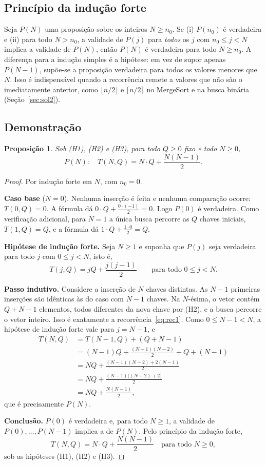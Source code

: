 \documentclass[11pt,a4paper]{article}
\newtheorem{proposicao}{Proposição}
\begin{document}
\subsection{Princípio da indução forte}

Seja $P(N)$ uma proposição sobre os inteiros $N\ge n_0$. Se (i) $P(n_0)$ é verdadeira e (ii) para todo $N>n_0$, a validade de $P(j)$ para \emph{todos} os $j$ com $n_0\le j<N$ implica a validade de $P(N)$, então $P(N)$ é verdadeira para todo $N\ge n_0$. A diferença para a indução simples é a hipótese: em vez de supor apenas $P(N-1)$, supõe-se a proposição verdadeira para todos os valores menores que $N$. Isso é indispensável quando a recorrência remete a valores que não são o imediatamente anterior, como $\lfloor n/2\rfloor$ e $\lceil n/2\rceil$ no MergeSort e na busca binária (Seção~\ref{sec:sol2}).

\subsection{Demonstração}

\begin{proposicao}
\label{prop:t1}
Sob (H1), (H2) e (H3), para todo $Q\ge0$ fixo e todo $N\ge0$,
\[
P(N):\quad T(N,Q)=N\cdot Q+\frac{N(N-1)}{2}.
\]
\end{proposicao}

\begin{proof}
Por indução forte em $N$, com $n_0=0$.

\textbf{Caso base} ($N=0$). Nenhuma inserção é feita e nenhuma comparação ocorre: $T(0,Q)=0$. A fórmula dá $0\cdot Q+\frac{0\cdot(-1)}{2}=0$. Logo $P(0)$ é verdadeira. Como verificação adicional, para $N=1$ a única busca percorre as $Q$ chaves iniciais, $T(1,Q)=Q$, e a fórmula dá $1\cdot Q+\frac{1\cdot0}{2}=Q$.

\textbf{Hipótese de indução forte.} Seja $N\ge1$ e suponha que $P(j)$ seja verdadeira para todo $j$ com $0\le j<N$, isto é,
\[
T(j,Q)=jQ+\frac{j(j-1)}{2}\qquad\text{para todo }0\le j<N.
\]

\textbf{Passo indutivo.} Considere a inserção de $N$ chaves distintas. As $N-1$ primeiras inserções são idênticas às do caso com $N-1$ chaves. Na $N$-ésima, o vetor contém $Q+N-1$ elementos, todos diferentes da nova chave por (H2), e a busca percorre o vetor inteiro. Isso é exatamente a recorrência~\eqref{eq:rec1}. Como $0\le N-1<N$, a hipótese de indução forte vale para $j=N-1$, e
\begin{align*}
T(N,Q)&=T(N-1,Q)+(Q+N-1)\\
&=(N-1)Q+\frac{(N-1)(N-2)}{2}+Q+(N-1)\\
&=NQ+\frac{(N-1)(N-2)+2(N-1)}{2}\\
&=NQ+\frac{(N-1)\big((N-2)+2\big)}{2}\\
&=NQ+\frac{N(N-1)}{2},
\end{align*}
que é precisamente $P(N)$.

\textbf{Conclusão.} $P(0)$ é verdadeira e, para todo $N\ge1$, a validade de $P(0),\ldots,P(N-1)$ implica a de $P(N)$. Pelo princípio da indução forte,
\[
T(N,Q)=N\cdot Q+\frac{N(N-1)}{2}\quad\text{para todo }N\ge0,
\]
sob as hipóteses (H1), (H2) e (H3).
\end{proof}
\end{document}
